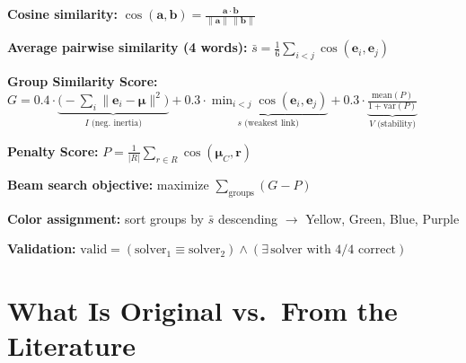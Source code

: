 \documentclass[11pt, letterpaper]{article}
\begin{document}
\begin{tcolorbox}[colback=codebg, colframe=black!50, title=\textbf{All Formulas in One Place}]

\textbf{Cosine similarity:}
$\displaystyle \cos(\mathbf{a}, \mathbf{b}) = \frac{\mathbf{a} \cdot \mathbf{b}}{\|\mathbf{a}\| \, \|\mathbf{b}\|}$
\vspace{6pt}

\textbf{Average pairwise similarity (4 words):}
$\displaystyle \bar{s} = \frac{1}{6}\sum_{i<j} \cos(\mathbf{e}_i, \mathbf{e}_j)$
\vspace{6pt}

\textbf{Group Similarity Score:}
$\displaystyle G = 0.4 \cdot \underbrace{\bigl(-\textstyle\sum_i \|\mathbf{e}_i - \boldsymbol{\mu}\|^2\bigr)}_{I\text{ (neg.\ inertia)}} + 0.3 \cdot \underbrace{\min_{i<j}\cos(\mathbf{e}_i,\mathbf{e}_j)}_{s\text{ (weakest link)}} + 0.3 \cdot \underbrace{\frac{\text{mean}(P)}{1+\text{var}(P)}}_{V\text{ (stability)}}$
\vspace{6pt}

\textbf{Penalty Score:}
$\displaystyle P = \frac{1}{|R|}\sum_{r \in R} \cos(\boldsymbol{\mu}_C, \mathbf{r})$
\vspace{6pt}

\textbf{Beam search objective:} maximize $\displaystyle\sum_{\text{groups}} (G - P)$
\vspace{6pt}

\textbf{Color assignment:} sort groups by $\bar{s}$ descending $\to$ Yellow, Green, Blue, Purple
\vspace{6pt}

\textbf{Validation:} $\text{valid} = (\text{solver}_1 \equiv \text{solver}_2) \wedge (\exists\, \text{solver with 4/4 correct})$

\end{tcolorbox}

\section{What Is Original vs.\ From the Literature}
\end{document}
